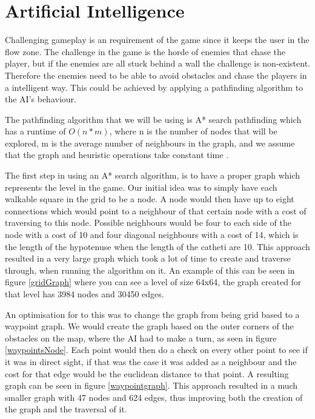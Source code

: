 \section{Artificial Intelligence}
Challenging gameplay is an requirement of the game since it keeps the user in the flow zone. %
The challenge in the game is the horde of enemies that chase the player, but if the enemies are all stuck behind a wall the challenge is non-existent.
Therefore the enemies need to be able to avoid obstacles and chase the players in a intelligent way.
This could be achieved by applying a pathfinding algorithm to the AI's behaviour.

The pathfinding algorithm that we will be using is A* search pathfinding which has a runtime of $O(n*m)$, where n is the number of nodes that will be explored, m is the average number of neighbours in the graph, and we assume that the graph and heuristic operations take constant time \cite{AIG:Millington}.

The first step in using an A* search algorithm, is to have a proper graph which represents the level in the game.
Our initial idea was to simply have each walkable square in the grid to be a node.
A node would then have up to eight connections which would point to a neighbour of that certain node with a cost of traversing to this node.
Possible neighbours would be four to each side of the node with a cost of 10 and four diagonal neighbours with a cost of 14, which is the length of the hypotenuse when the length of the catheti are 10.
This approach resulted in a very large graph which took a lot of time to create and traverse through, when running the algorithm on it.
An example of this can be seen in figure \ref{gridGraph} where you can see a level of size 64x64, the graph created for that level has 3984 nodes and 30450 edges.

An optimisation for to this was to change the graph from being grid based to a waypoint graph.
We would create the graph based on the outer corners of the obstacles on the map, where the AI had to make a turn, as seen in figure \ref{waypointsNode}.
Each point would then do a check on every other point to see if it was in direct sight, if that was the case it was added as a neighbour and the cost for that edge would be the euclidean distance to that point.
A resulting graph can be seen in figure \ref{waypointgraph}.
This approach resulted in a much smaller graph with 47 nodes and 624 edges, thus improving both the creation of the graph and the traversal of it.

